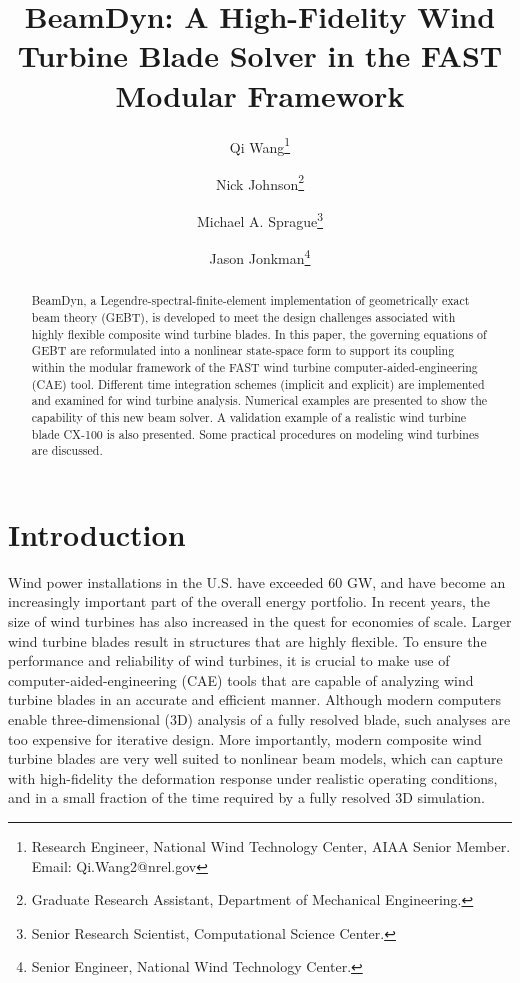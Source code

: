 \documentclass{aiaa-tc}
\title{BeamDyn: A High-Fidelity Wind Turbine Blade Solver in the FAST
Modular Framework}
\author[1]{Qi Wang\thanks{Research Engineer, National Wind Technology Center, AIAA Senior Member. Email: Qi.Wang2@nrel.gov}}
\author[2]{Nick Johnson\thanks{Graduate Research Assistant, Department of
Mechanical Engineering.}}
\author[1]{Michael A. Sprague\thanks{Senior Research Scientist, 
Computational Science Center.}}
\author[1]{Jason Jonkman\thanks{Senior Engineer, National Wind Technology Center.}}
\affil[1]{National Renewable Energy Laboratory, Golden, CO 80401}
\affil[2]{Colorado School of Mines, Golden, CO 80401}
\begin{document}
\maketitle

\begin{abstract}
{BeamDyn, a Legendre-spectral-finite-element implementation of geometrically
exact beam theory (GEBT), is developed to meet the design challenges
associated with highly flexible composite wind turbine blades. In this
paper, the governing equations of GEBT are reformulated into a nonlinear
state-space form to support its coupling within the
modular framework of the FAST wind turbine
computer-aided-engineering (CAE) tool. Different time integration
schemes (implicit and explicit) are implemented and examined for wind
turbine analysis.  Numerical examples are presented to show the capability of this new beam solver. A validation example of a realistic wind turbine blade CX-100 is also presented. Some practical procedures on modeling wind turbines are discussed.}     
\end{abstract}

\section{Introduction} Wind power installations in the U.S. have exceeded 60
GW, and have become an increasingly important part of the overall energy
portfolio. In recent years, the size of wind turbines has also increased in
the quest for economies of scale.  Larger wind turbine blades result in
structures that are highly flexible.  To ensure the performance and
reliability of wind turbines, it is crucial to make use of
computer-aided-engineering (CAE) tools that are capable of analyzing wind
turbine blades in an accurate and efficient manner. Although modern
computers enable three-dimensional (3D) analysis
of a fully resolved blade, such analyses are too
expensive for iterative design. More importantly, modern composite wind
turbine blades are very well suited to nonlinear beam models, which can
capture with high-fidelity the deformation response under realistic
operating conditions, and in a small fraction of the time required by a
fully resolved 3D simulation. 
\end{document}
